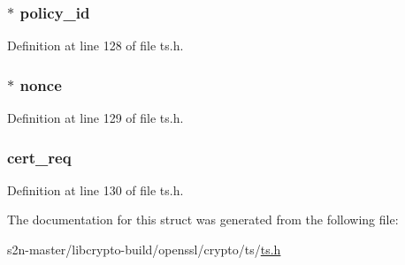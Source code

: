 \subsubsection[{\texorpdfstring{policy\+\_\+id}{policy_id}}]{ $\ast$ policy\+\_\+id}\hypertarget{struct_t_s__req__st_a2c948c122f4d643085abf0c35d6dffbe}{}\label{struct_t_s__req__st_a2c948c122f4d643085abf0c35d6dffbe}


Definition at line 128 of file ts.\+h.

\subsubsection[{\texorpdfstring{nonce}{nonce}}]{ $\ast$ nonce}\hypertarget{struct_t_s__req__st_a8b13ecb2aac904e4547773630a3b51e6}{}\label{struct_t_s__req__st_a8b13ecb2aac904e4547773630a3b51e6}


Definition at line 129 of file ts.\+h.

\subsubsection[{\texorpdfstring{cert\+\_\+req}{cert_req}}]{ cert\+\_\+req}\hypertarget{struct_t_s__req__st_aa3a2aa80120cdcec8c6aac169e542813}{}\label{struct_t_s__req__st_aa3a2aa80120cdcec8c6aac169e542813}


Definition at line 130 of file ts.\+h.



The documentation for this struct was generated from the following file\+:\begin{DoxyCompactItemize}
\item 
s2n-\/master/libcrypto-\/build/openssl/crypto/ts/\hyperlink{crypto_2ts_2ts_8h}{ts.\+h}\end{DoxyCompactItemize}
